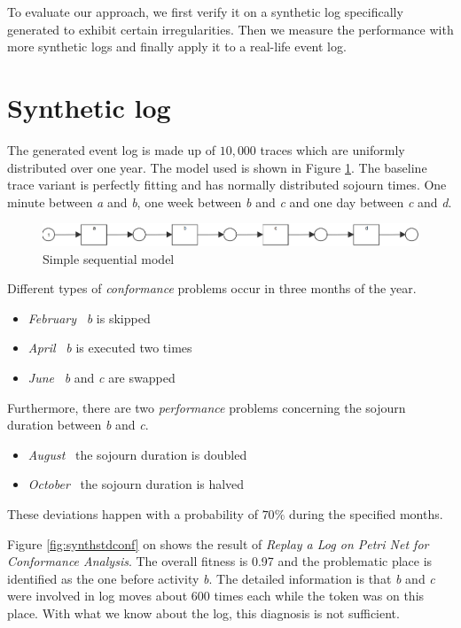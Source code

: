 To evaluate our approach, we first verify it on a synthetic log specifically generated to exhibit certain irregularities. Then we measure the performance with more synthetic logs and finally apply it to a real-life event log.

\section{Synthetic log}
The generated event log is made up of $10,000$ traces which are uniformly distributed over one year. The model used is shown in Figure \ref{fig:synthmodel}. The baseline trace variant is perfectly fitting and has normally distributed sojourn times. One minute between \emph{a} and \emph{b}, one week between \emph{b} and \emph{c} and one day between \emph{c} and \emph{d}.
\begin{figure}
    \centering
    \includegraphics[width=\textwidth]{figures/evaluation/synth_model.png}
    \caption{Simple sequential model}
    \label{fig:synthmodel}
\end{figure}
Different types of \emph{conformance} problems occur in three months of the year. 
\begin{itemize}
    \item \emph{February} \textemdash \ \emph{b} is skipped
    \item \emph{April} \textemdash \ \emph{b} is executed two times
    \item \emph{June} \textemdash \ \emph{b} and \emph{c} are swapped
\end{itemize}
Furthermore, there are two \emph{performance} problems concerning the sojourn duration between \emph{b} and \emph{c}. 
\begin{itemize}
    \item \emph{August} \textemdash \ the sojourn duration is doubled
    \item \emph{October} \textemdash \ the sojourn duration is halved
\end{itemize}
These deviations happen with a probability of $70\%$ during the specified months.

Figure \ref{fig:synthstdconf} on  shows the result of \emph{Replay a Log on Petri Net for Conformance Analysis}. The overall fitness is 0.97 and the problematic place is identified as the one before activity \emph{b}. The detailed information is that \emph{b} and \emph{c} were involved in log moves about $600$ times each while the token was on this place.
With what we know about the log, this diagnosis is not sufficient.

